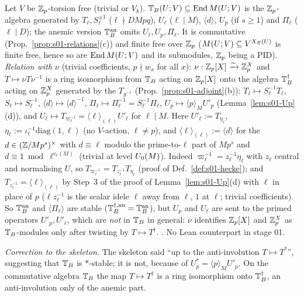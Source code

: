 \begin{definition}\label{def:s01-T}
Let $V$ be $\mathbb{Z}_p$-torsion free (trivial or $V_k$). $\mathbb{T}_B(U;V)\subseteq\operatorname{End}M(U;V)$ is the $\mathbb{Z}_p$-algebra generated by
$T_\ell,S_\ell^{\pm1}$ ($\ell\nmid DMpq$), $U_\ell$ ($\ell\mid M$), $\langle d\rangle$, $U_p$ (if $s\ge1$) and $\Pi_\ell$ ($\ell\mid D$); the anemic
version $\mathbb{T}_B^{\mathrm{an}}$ omits $U_\ell,U_p,\Pi_\ell$. It is commutative (Prop.~\ref{prop:s01-relations}(c)) and finite free over $\mathbb{Z}_p$
($M(U;V)\subseteq V^{X_B(U)}$ is finite free, hence so are $\operatorname{End}M(U;V)$ and its submodules, $\mathbb{Z}_p$ being a PID).
\emph{Relation with $\nu$} (trivial coefficients, $p\nmid w_x$ for all $x$): $\nu:\mathbb{Z}_p[X]\xrightarrow{\sim}\mathbb{Z}_p^X$ and $T\mapsto\nu T\nu^{-1}$ is a
ring isomorphism from $\mathbb{T}_B$ acting on $\mathbb{Z}_p[X]$ onto the algebra $\mathbb{T}_B^\dagger$ acting on $\mathbb{Z}_p^X$ generated by the $T_{g^{-1}}$
(Prop.~\ref{prop:s01-adjoint}(b)): $T_\ell\mapsto S_\ell^{-1}T_\ell$, $S_\ell\mapsto S_\ell^{-1}$, $\langle d\rangle\mapsto\langle d\rangle^{-1}$,
$\Pi_\ell\mapsto\Pi_\ell^{-1}=S_\ell^{-1}\Pi_\ell$, $U_p\mapsto\langle p\rangle_MU'_p$ (Lemma~\ref{lem:s01-Up}(d)), and
$U_\ell\mapsto T_{\varpi_\ell^{-1}}=\langle\ell\rangle_{(\ell)}U'_\ell$ for $\ell\mid M$. Here $U'_\ell:=T_{\eta_\ell}$,
$\eta_\ell:=\iota_\ell^{-1}\mathrm{diag}(1,\ell)$ (no $V$-action, $\ell\ne p$), and $\langle\ell\rangle_{(\ell)}:=\langle d\rangle$ for the
$d\in(\mathbb{Z}/Mp^s)^\times$ with $d\equiv\ell$ modulo the prime-to-$\ell$ part of $Mp^s$ and $d\equiv1\bmod\ell^{v_\ell(M)}$ (trivial at level
$U_0(M)$). Indeed $\varpi_\ell^{-1}=z_\ell^{-1}\eta_\ell$ with $z_\ell$ central and normalising $U$, so $T_{\varpi_\ell^{-1}}=T_{z_\ell^{-1}}T_{\eta_\ell}$
(proof of Def.~\ref{def:s01-hecke}); and $T_{z_\ell^{-1}}=\langle\ell\rangle_{(\ell)}$ by Step~3 of the proof of Lemma~\ref{lem:s01-Up}(d)
with $\ell$ in place of $p$ ($\ell z_\ell^{-1}$ is the scalar idele $\ell$ away from $\ell$, $1$ at $\ell$; trivial coefficients). So
$\mathbb{T}_B^{\mathrm{an}}$ and $\langle\Pi_\ell\rangle$ are stable ($\mathbb{T}_B^{\dagger,\mathrm{an}}=\mathbb{T}_B^{\mathrm{an}}$), but $U_p$ and $U_\ell$ are sent to the
primed operators $U'_p,U'_\ell$, which are \emph{not} in $\mathbb{T}_B$ in general: $\nu$ identifies $\mathbb{Z}_p[X]$ and $\mathbb{Z}_p^X$ as $\mathbb{T}_B$-modules only
after twisting by $T\mapsto T^\dagger$.
\stproved{}. No Lean counterpart in stage 01.
\end{definition}
\noindent\emph{Correction to the skeleton.} The skeleton said ``up to the anti-involution $T\mapsto T^*$'', suggesting that
$\mathbb{T}_B$ is $*$-stable; it is not, because of $U_p^*=\langle p\rangle_MU'_p$. On the commutative algebra $\mathbb{T}_B$ the map $T\mapsto T^\dagger$
is a ring isomorphism onto $\mathbb{T}_B^\dagger$, an anti-involution only of the anemic part.


